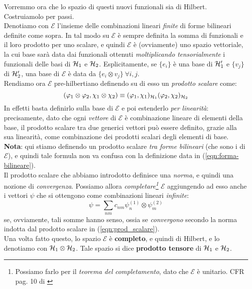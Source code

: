\documentclass[../../FisicaTeorica.tex]{subfiles}
\begin{document}
\begin{dfn}
Vorremmo ora che lo spazio di questi nuovi funzionali sia di Hilbert. Costruiamolo per passi.\\
Denotiamo con $\mathcal{E}$ l'insieme delle combinazioni lineari \textit{finite} di forme bilineari definite come sopra. In tal modo su $\mathcal{E}$ è sempre definita la somma di funzionali e il loro prodotto per uno scalare, e quindi $\mathcal{E}$ è (ovviamente) uno spazio vettoriale, la cui base sarà data dai funzionali ottenuti \textit{moltiplicando tensorialmente} i funzionali delle basi di $\mathcal{H}_1$ e $\mathcal{H}_2$. Esplicitamente, se $\{e_i\}$ è una base di $\mathcal{H}_1'$ e $\{v_j\}$ di $\mathcal{H}_2'$, una base di $\mathcal{E}$ è data da $\{e_i \otimes v_j\} \> \forall i,j$.\\
Rendiamo ora $\mathcal{E}$ pre-hilbertiano definendo su di esso un \textit{prodotto scalare} come:
\begin{equation}
(\varphi_1 \otimes \varphi_2, \chi_1 \otimes \chi_2)\equiv (\varphi_1, \chi_1)_{\mathcal{H}_1}(\varphi_2,\chi_2)_{\mathcal{H}_2}
\label{eqn:prod_scalare}
\end{equation}
In effetti basta definirlo sulla base di $\mathcal{E}$ e poi estenderlo \textit{per linearità}: precisamente, dato che ogni \textit{vettore} di $\mathcal{E}$ è combinazione lineare di elementi della base, il prodotto scalare tra due generici vettori può essere definito, grazie alla sua linearità, come combinazione dei prodotti scalari degli elementi di base.\\
\textbf{Nota}: qui stiamo definendo un prodotto scalare \textit{tra forme bilineari} (che sono i  di $\mathcal{E}$), e quindi tale formula non va confusa con la definizione data in (\ref{eqn:forma-bilineare}).\\

Il prodotto scalare che abbiamo introdotto definisce una \textit{norma}, e quindi una nozione di \textit{convergenza}. Possiamo allora \textit{completare\footnote{Possiamo farlo per il \textit{teorema del completamento}, dato che $\mathcal{E}$ è unitario. CFR pag. 10 di \cite{spazi_hilbert}}} $\mathcal{E}$ aggiungendo ad esso anche i vettori $\psi$ che si ottengono come combinazioni lineari \textit{infinite}:
\[
\psi=\sum_{nm} c_{nm} \psi_n^{(1)}\otimes\psi_m^{(2)}
\]
se, ovviamente, tali somme hanno senso, ossia se \textit{convergono} secondo la norma indotta dal prodotto scalare in (\ref{eqn:prod_scalare}).\\

Una volta fatto questo, lo spazio $\mathcal{E}$ è \textbf{completo}, e quindi di Hilbert, e lo denotiamo con $\mathcal{H}_1 \otimes \mathcal{H}_2$. Tale spazio si dice \textbf{prodotto tensore} di $\mathcal{H}_1$ e $\mathcal{H}_2$.
\end{dfn}
\end{document}
